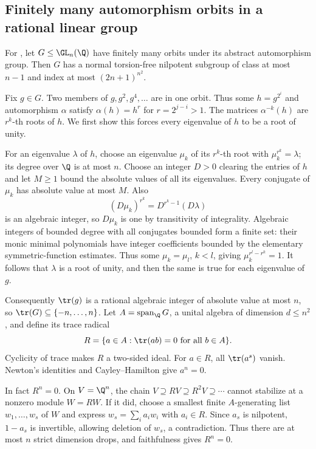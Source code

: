 \subsection{Finitely many automorphism orbits in a rational linear group}
\label{cand:21.40}

For , let \(G\leq\GL_n(\Q)\) have finitely
many orbits under its abstract automorphism group.
Then \(G\) has a normal torsion-free nilpotent subgroup
of class at most \(n-1\) and index at most
\((2n+1)^{n^2}\).

Fix \(g\in G\). Two members of \(g,g^2,g^4,\ldots\)
are in one orbit. Thus some \(h=g^{2^i}\) and
automorphism \(\alpha\) satisfy \(\alpha(h)=h^r\)
for \(r=2^{j-i}>1\). The matrices
\(\alpha^{-k}(h)\) are \(r^k\)-th roots of \(h\).
We first show this forces every eigenvalue of \(h\)
to be a root of unity.

For an eigenvalue \(\lambda\) of \(h\), choose an
eigenvalue \(\mu_k\) of its \(r^k\)-th root with
\(\mu_k^{r^k}=\lambda\); its degree over \(\Q\)
is at most \(n\). Choose an integer \(D>0\) clearing
the entries of \(h\) and let \(M\geq1\) bound the
absolute values of all its eigenvalues. Every conjugate
of \(\mu_k\) has absolute value at most \(M\).
Also
\[
 (D\mu_k)^{r^k}=D^{r^k-1}(D\lambda)
\]
is an algebraic integer, so \(D\mu_k\) is one by
transitivity of integrality. Algebraic integers of
bounded degree with all conjugates bounded form a
finite set: their monic minimal polynomials have
integer coefficients bounded by the elementary
symmetric-function estimates. Thus some
\(\mu_k=\mu_l\), \(k<l\), giving
\(\mu_k^{r^l-r^k}=1\). It follows that \(\lambda\)
is a root of unity, and then the same is true for
each eigenvalue of \(g\).

Consequently \(\tr(g)\) is a rational algebraic integer
of absolute value at most \(n\), so
\(\tr(G)\subseteq\{-n,\ldots,n\}\).
Let \(A=\operatorname{span}_{\Q}G\), a unital algebra
of dimension \(d\leq n^2\), and define its trace radical
\[
 R=\{a\in A:\tr(ab)=0\text{ for all }b\in A\}.
\]
Cyclicity of trace makes \(R\) a two-sided ideal.
For \(a\in R\), all \(\tr(a^s)\) vanish. Newton's
identities and Cayley--Hamilton give \(a^n=0\).

In fact \(R^n=0\). On \(V=\Q^n\), the chain
\(V\supseteq RV\supseteq R^2V\supseteq\cdots\)
cannot stabilize at a nonzero module \(W=RW\).
If it did, choose a smallest finite \(A\)-generating
list \(w_1,\ldots,w_s\) of \(W\) and express
\(w_s=\sum_i a_iw_i\) with \(a_i\in R\).
Since \(a_s\) is nilpotent, \(1-a_s\) is invertible,
allowing deletion of \(w_s\), a contradiction.
Thus there are at most \(n\) strict dimension drops,
and faithfulness gives \(R^n=0\).

